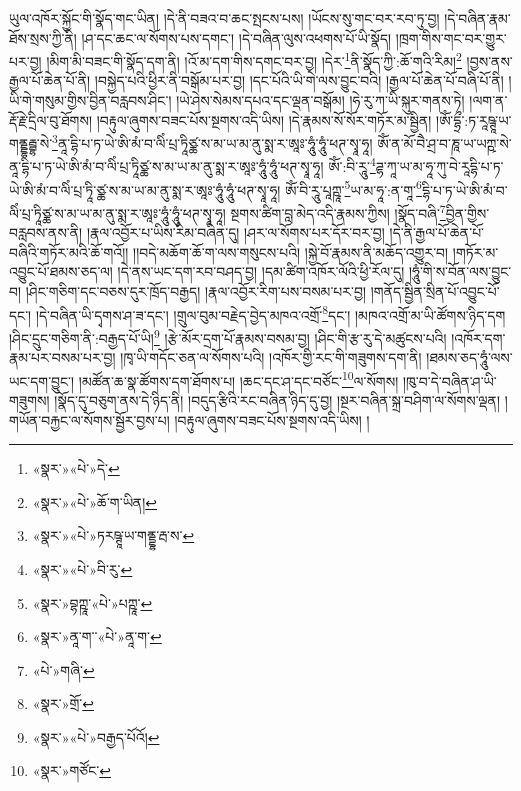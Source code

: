 ཡུལ་འཁོར་སྐྱོང་གི་སྣོད་གང་ཡིན། །དེ་ནི་བཟའ་བ་ཆང་སྤངས་པས། །ཡོངས་སུ་གང་བར་རབ་ཏུ་བྱ། །དེ་བཞིན་རྣམ་ཐོས་སྲས་ཀྱི་ནི། །ཤ་དང་ཆང་ལ་སོགས་པས་དགང་། །དེ་བཞིན་ལུས་འཕགས་པོ་ཡི་སྣོད། །ཁྲག་གིས་གང་བར་གྱུར་པར་བྱ། །མིག་མི་བཟང་གི་སྣོད་དག་ནི། །འོ་མ་དག་གིས་དགང་བར་བྱ། །དེར་\footnote{«སྣར་»«པེ་»དེ་}ནི་སྣོད་ཀྱི་:ཆོ་གའི་རིམ།\footnote{«སྣར་»«པེ་»ཆོ་ག་ཡིན།} །བྱས་ནས་རྒྱལ་པོ་ཆེན་པོ་ནི། །བསྐྱེད་པའི་ཕྱིར་ནི་བསྒོམ་པར་བྱ། །དང་པོའི་ཡི་གེ་ལས་བྱུང་བའི། །རྒྱལ་པོ་ཆེན་པོ་བཞི་པོ་ནི། །ཡི་གེ་གསུམ་གྱིས་བྱིན་བརླབས་ཤིང་། །ཡེ་ཤེས་སེམས་དཔའ་དང་ལྡན་བསྒོམ། །ཧེ་རུ་ཀ་ཡི་སྐུར་གནས་ཏེ། །ལག་ན་རྡོ་རྗེ་དྲིལ་བུ་ཐོགས། །བརྟུལ་ཞུགས་བཟང་པོས་སྔགས་འདི་ཡིས། །དེ་རྣམས་སོ་སོར་གཏོར་མ་སྦྱིན། །ཨོཾ་དྷྲྀ་:ཏ་རཱཥྚཱ་ཡ་གནྡྷརྦྷ་སེ་\footnote{«སྣར་»«པེ་»ཏརཥྚཱ་ཡ་གནྡྷ་རྦ་ས་}ནཱ་དྷི་པ་ཏ་ཡེ་ཨི་མཾ་བ་ལིཾ་པྲ་ཏཱིཙྪ་ས་མ་ཡ་མ་ནུ་སྨ་ར་ཨཱཿ་ཧཱུཾ་ཧཱུཾ་ཕཊ་སྭཱ་ཧཱ། ཨོཾ་ན་མོ་བཻ་ཤྲ་བ་ཎཱ་ཡ་ཡཀྵ་སེ་ནཱ་དྷི་པ་ཏ་ཡེ་ཨི་མཾ་བ་ལིཾ་པྲ་ཏཱིཙྪ་ས་མ་ཡ་མ་ནུ་སྨ་ར་ཨཱཿ་ཧཱུཾ་ཧཱུཾ་ཕཊ་སྭཱ་ཧཱ། ཨོཾ་:བི་རཱུ་\footnote{«སྣར་»«པེ་»བི་རུ་}ཌྷ་ཀཱ་ཡ་མ་ཧཱ་ཀུ་བེ་རཱདྷི་པ་ཏ་ཡེ་ཨི་མཾ་བ་ལིཾ་པྲ་ཏཱི་ཙྪ་ས་མ་ཡ་མ་ནུ་སྨ་ར་ཨཱཿ་ཧཱུཾ་ཧཱུཾ་ཕཊ་སྭཱ་ཧཱ། ཨོཾ་བི་རཱུ་པཱཀྵཱ་\footnote{«སྣར་»བྷཀྵཱ་«པེ་»པཀྵཱ་}ཡ་མ་ཧཱ་:ན་གཱ་\footnote{«སྣར་»ནཱ་ག་་«པེ་»ནཱ་ག་}དྷི་པ་ཏ་ཡེ་ཨི་མཾ་བ་ལིཾ་པྲ་ཏཱིཙྪ་ས་མ་ཡ་མ་ནུ་སྨ་ར་ཨཱཿ་ཧཱུཾ་ཧཱུཾ་ཕཊ་སྭཱ་ཧཱ། སྔགས་ཚིག་བླ་མེད་འདི་རྣམས་ཀྱིས། །སྣོད་བཞི་\footnote{«པེ་»གཞི་}བྱིན་གྱིས་བརླབས་ནས་ནི། །རྣལ་འབྱོར་པ་ཡིས་རིམ་བཞིན་དུ། །ཤར་ལ་སོགས་པར་དོར་བར་བྱ། །དེ་ནི་རྒྱལ་པོ་ཆེན་པོ་བཞིའི་གཏོར་མའི་ཆོ་གའོ།། །།བདེ་མཆོག་ཆོ་ག་ལས་གསུངས་པའི། །སྐྱེ་བོ་རྣམས་ནི་མཆོད་འགྱུར་བ། །གཏོར་མ་འབྱུང་པོ་ཐམས་ཅད་ལ། །དེ་ནས་ཡང་དག་རབ་བཤད་བྱ། །དམ་ཚིག་འཁོར་ལོའི་ཕྱི་རོལ་དུ། །ཧཱུཾ་གི་ས་བོན་ལས་བྱུང་བ། །ཤིང་གཅིག་དང་བཅས་དུར་ཁྲོད་བརྒྱད། །རྣལ་འབྱོར་རིག་པས་བསམ་པར་བྱ། །གནོད་སྦྱིན་སྲིན་པོ་འབྱུང་པོ་དང་། །དེ་བཞིན་ཡི་དྭགས་ཤ་ཟ་དང་། །གྲུལ་བུམ་བརྗེད་བྱེད་མཁའ་འགྲོ་\footnote{«སྣར་»གྲོ་}དང་། །མཁའ་འགྲོ་མ་ཡི་ཚོགས་ཉིད་དག །ཤིང་དྲུང་གཅིག་ནི་:བརྒྱད་པོ་ཡི།\footnote{«སྣར་»«པེ་»བརྒྱད་པོའོ།} །རྩེ་མོར་དྲག་པོ་རྣམས་བསམ་བྱ། །ཤིང་གི་རྩ་རུ་དེ་མཚུངས་པའི། །འཁོར་དག་རྣམ་པར་བསམ་པར་བྱ། །ཁྭ་ཡི་གདོང་ཅན་ལ་སོགས་པའི། །འཁོར་གྱི་རང་གི་གཟུགས་དག་ནི། །ཐམས་ཅད་ཧཱུཾ་ལས་ཡང་དག་བྱུང་། །མཚོན་ཆ་སྣ་ཚོགས་དག་ཐོགས་པ། །ཆང་དང་ཤ་དང་བཙོང་\footnote{«སྣར་»གཙོང་}ལ་སོགས། །ཁུ་བ་དེ་བཞིན་ཤ་ཡི་གཟུགས། །སྣོད་དུ་བཅུག་ནས་དེ་ཉིད་ནི། །བདུད་རྩིའི་རང་བཞིན་ཉིད་དུ་བྱ། །སྔར་བཞིན་སྐྲ་བཤིག་ལ་སོགས་ལྡན། །གཡོན་བརྐྱང་ལ་སོགས་སྦྱོར་བྱས་པ། །བརྟུལ་ཞུགས་བཟང་པོས་སྔགས་འདི་ཡིས། །
